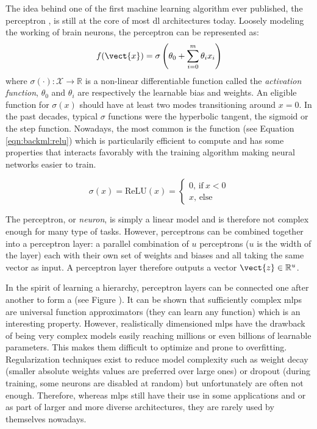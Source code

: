The idea behind one of the first machine learning algorithm ever published, the perceptron \parencite{rosenblatt1958perceptron}, is still at the core of most \acrlong{dl} architectures today. Loosely modeling the working of brain neurons, the perceptron can be represented as: 
\begin{equation}
\label{eqn:backml:perceptron}
f(\vect{x}) = \sigma\left(\theta_0 + \sum_{i=0}^m \theta_i x_i\right)
\end{equation}
where $\sigma(\cdot): \mathcal{X} \rightarrow \mathbb{R}$ is a non-linear differentiable function called the \textit{activation function}, $\theta_0$ and $\theta_i$ are respectively the learnable bias and weights. An eligible function for $\sigma(x)$ should have at least two modes transitioning around $x=0$. In the past decades, typical $\sigma$ functions were the hyperbolic tangent, the sigmoid or the step function. Nowadays, the most common is the  function (see Equation \ref{eqn:backml:relu}) which is particularily efficient to compute and has some properties that interacts favorably with the training algorithm making neural networks easier to train.

\begin{equation}
\label{eqn:backml:relu}
\sigma(x) = \text{ReLU}(x) = \begin{cases}
0\text{, if}~ x < 0\\
x\text{, else}
\end{cases}
\end{equation}

The perceptron, or \textit{neuron}, is simply a linear model and is therefore not complex enough for many type of tasks. However, perceptrons can be combined together into a perceptron layer: a parallel combination of $u$ perceptrons ($u$ is the width of the layer) each with their own set of weights and biases and all taking the same vector as input. A perceptron layer therefore outputs a vector $\vect{z} \in \mathbb{R}^u$. 

In the spirit of learning a hierarchy, perceptron layers can be connected one after another to form a  (see Figure ). It can be shown that sufficiently complex \acrshort{mlp}s are universal function approximators (\ie they can learn any function) \parencite{hornik1989multilayer} which is an interesting property. However, realistically dimensioned \acrshort{mlp}s have the drawback of being very complex models easily reaching millions or even billions of learnable parameters. This makes them difficult to optimize and prone to overfitting. Regularization techniques exist to reduce model complexity such as weight decay (\ie smaller absolute weights values are preferred over large ones) or dropout \parencite{srivastava2014dropout} (\eg during training, some neurons are disabled at random) but unfortunately are often not enough. Therefore, whereas \acrshort{mlp}s still have their use in some applications and or as part of larger and more diverse architectures, they are rarely used by themselves nowadays.

